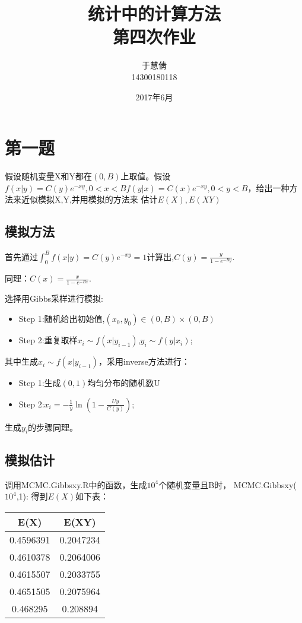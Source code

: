 \documentclass{ctexart}
\title{统计中的计算方法 \\ 第四次作业}
\author{于慧倩 \\ 14300180118}
\date{2017年6月}
\begin{document}
\maketitle

\newpage

\section{第一题}

假设随机变量X和Y都在\((0,B)\)上取值。假设\(f(x|y)=C(y) e^{-xy},0<x<B  f(y|x)=C(x)e^{-xy},0<y<B\)，给出一种方法来近似模拟X,Y,并用模拟的方法来
估计\(E(X),E(XY)\)

\subsection{模拟方法}

首先通过\(\int_0^B f(x|y)=C(y) e^{-xy}=1\)计算出,\(C(y)=\frac{y}{1-e^{-By}}\).

同理：\(C(x)=\frac{x}{1-e^{-Bx}}\).

选择用Gibbs采样进行模拟:
\begin{itemize} 
\item Step 1:随机给出初始值,\((x_0,y_0) \in (0,B)\times(0,B)\)
\item Step 2:重复取样\(x_i  \sim f(x|y_{i-1})\),\(y_i \sim f(y|x_i)\);
\end{itemize}

其中生成\(x_i  \sim f(x|y_{i-1})\)，采用inverse方法进行：
\begin{itemize} 
\item Step 1:生成\((0,1)\)均匀分布的随机数U
\item Step 2:\(x_i=-\frac{1}{y} \ln (1-\frac{Uy}{C(y)})\);
\end{itemize}

生成\(y_i\)的步骤同理。

\subsection{模拟估计}

调用MCMC.Gibbsxy.R中的函数，生成\(10^4 \)个随机变量且B时，
MCMC.Gibbsxy(\(10^4\),1):
得到\(E(X)\)如下表：
\begin{table}[h]
\centering
\begin{tabular}{| c |c| }
          \hline
          \bf E(X) &\bf E(XY) \\
          \hline
  0.4596391 &0.2047234 \\
          \hline
 0.4610378 & 0.2064006\\
          \hline
       0.4615507 & 0.2033755\\
          \hline
 0.4651505 &0.2075964\\
\hline
0.468295 & 0.208894\\
\hline
\end{tabular}
\end{table}
\end{document}
